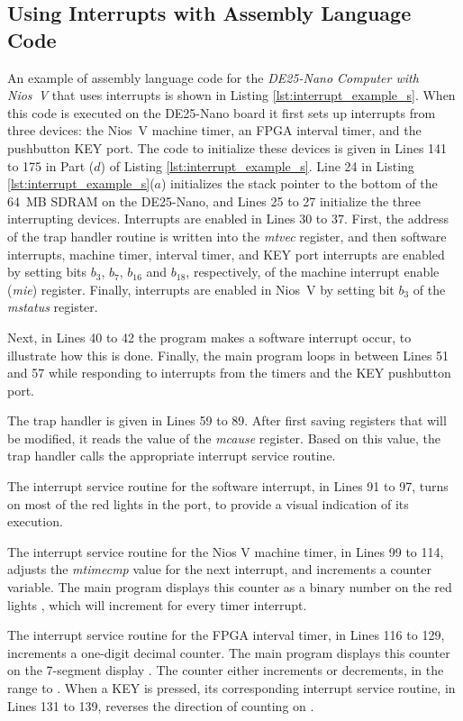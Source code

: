 \documentclass[11pt, twoside, pdftex]{article}
\newcommand{\DEBoard}{DE25-Nano}
\newcommand{\systemNameFull}{DE25-Nano Computer with Nios~V}
\begin{document}
\subsection{Using Interrupts with Assembly Language Code}

An example of assembly language code for the {\it \systemNameFull} that uses interrupts is
shown in Listing \ref{lst:interrupt_example_s}. When this code is executed on the
{\DEBoard} board it first sets up interrupts from three devices: the Nios~V machine timer, 
an FPGA interval timer, and the pushbutton KEY port. The code to initialize these devices
is given in Lines 141 to 175 in Part ($d$) of Listing \ref{lst:interrupt_example_s}. 
Line 24 in Listing \ref{lst:interrupt_example_s}($a$) initializes the stack pointer to
the bottom of the 64~MB SDRAM on the {\DEBoard}, and Lines 25 to 27 initialize the
three interrupting devices. Interrupts are enabled in Lines 30 to 37. First, the address of
the trap handler routine is written into the {\it mtvec} register, and then software
interrupts, machine timer, interval timer, and KEY port interrupts are
enabled by setting bits $b_3$, $b_7$, $b_{16}$ and $b_{18}$, respectively, of the 
machine interrupt enable ({\it mie}) register. 
Finally, interrupts are enabled in Nios~V by setting bit $b_3$ of the {\it mstatus} register.

Next, in Lines 40 to 42 the program makes a software 
interrupt occur, to illustrate how this is done. Finally, the main program loops in
between Lines 51 and 57 while responding to interrupts from the timers and the 
KEY pushbutton port. 

The trap handler is given in Lines 59 to 89. After first saving registers that will be
modified, it reads the value of the {\it mcause} register. Based on this value, the trap
handler calls the appropriate interrupt service routine. 

The interrupt service routine for the software interrupt, in Lines 91 to 97, 
turns on most of the red lights in the  port, to provide a visual indication of 
its execution. 

The interrupt service routine for the Nios V machine timer, in Lines 99 to 114,
adjusts the {\it mtimecmp} value for the next interrupt, and 
increments a counter variable. The main program displays this counter as a binary number 
on the red lights , which will increment for every timer interrupt.

The interrupt service routine for the FPGA interval timer, in Lines 116 to 129,
increments a one-digit decimal counter. The main program displays this counter on the 
7-segment display . The counter either increments or decrements,
in the range  to .  When a KEY is pressed, its corresponding 
interrupt service routine, in Lines 131 to 139, reverses the direction of counting on . 
\end{document}
